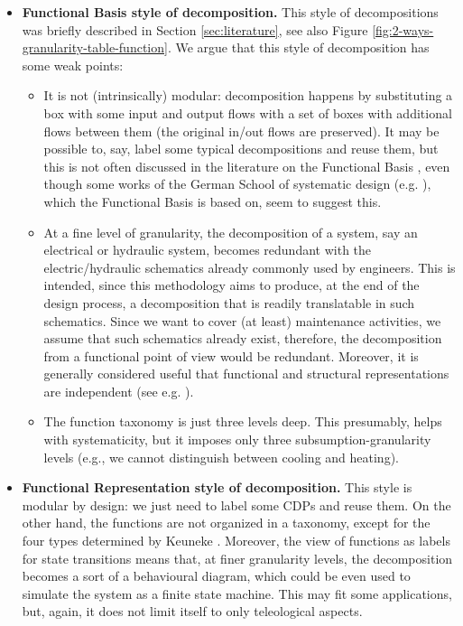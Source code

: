 \documentclass[
]{ceurart}
\begin{document}
\begin{itemize}
  \item \textbf{Functional Basis style of decomposition.} This style of decompositions was briefly described in Section \ref{sec:literature}, see also Figure \ref{fig:2-ways-granularity-table-function}. We argue that this style of decomposition has some weak points:
  \begin{itemize}
    \item It is not (intrinsically) modular: decomposition happens by substituting a box with some input and output flows with a set of boxes with additional flows between them (the original in/out flows are preserved). It may be possible to, say, label some typical decompositions and reuse them, but this is not often discussed in the literature on the Functional Basis , even though some works of the German School of systematic design (e.g. \cite{rothKonstruierenMitKonstruktionskatalogen2000}), which the Functional Basis is based on, seem to suggest this.
    \item At a fine level of granularity, the decomposition of a system, say an electrical or hydraulic system, becomes redundant with the electric/hydraulic schematics already commonly used by engineers. This is intended, since this methodology aims to produce, at the end of the design process, a decomposition that is readily translatable in such schematics. Since we want to cover (at least) maintenance activities, we assume that such schematics already exist, therefore, the decomposition from a functional point of view would be redundant. Moreover, it is generally considered useful that functional and structural representations are independent (see e.g. \cite{ISOIEC8134612009}).
    \item The function taxonomy is just three levels deep. This presumably, helps with systematicity, but it imposes only three subsumption-granularity levels (e.g., we cannot distinguish between cooling and heating).
  \end{itemize}
  \item \textbf{Functional Representation style of decomposition.} This style is modular by design: we just need to label some CDPs and reuse them. On the other hand, the functions are not organized in a taxonomy, except for the four types determined by Keuneke \cite{keuneke_device_1991}. Moreover, the view of functions as labels for state transitions means that, at finer granularity levels, the decomposition becomes a sort of a behavioural diagram, which could be even used to simulate the system as a finite state machine. This may fit some applications, but, again, it does not limit itself to only teleological aspects.

\end{itemize}
\end{document}
